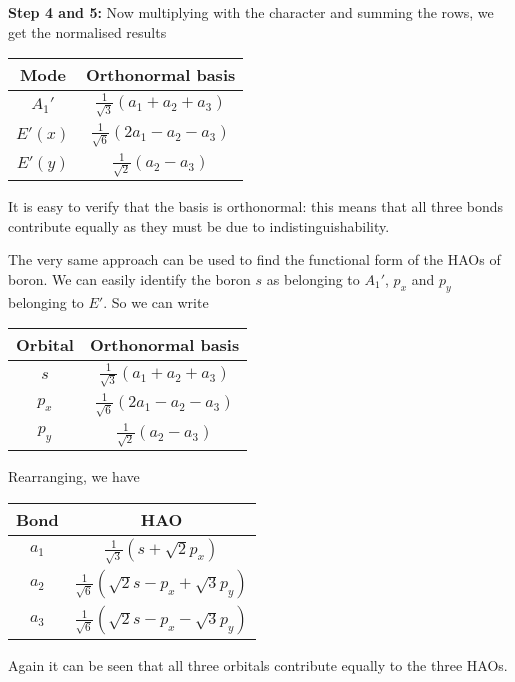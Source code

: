 \textbf{Step 4 and 5:} Now multiplying with the character and summing the rows, we get the normalised results
\begin{center}
	\begin{tabular}{c|c}
	Mode & Orthonormal basis\\
	\hline
	$A_1'$ & $\frac{1}{\sqrt{3}}(a_1+a_2+a_3)$\\
	$E'(x)$ & $\frac{1}{\sqrt{6}}(2a_1-a_2-a_3) $\\
	$E'(y)$ & $\frac{1}{\sqrt{2}}(a_2-a_3) $
	\end{tabular}
\end{center}
It is easy to verify that the basis is orthonormal: this means that all three bonds contribute equally as they must be due to indistinguishability. \par
The very same approach can be used to find the functional form of the HAOs of boron. We can easily identify the boron $s$ as belonging to $A_1'$, $p_x$ and $p_y$ belonging to $E'$. So we can write
\begin{center}
	\begin{tabular}{c|c}
	Orbital & Orthonormal basis\\
	\hline
	$s$ & $\frac{1}{\sqrt{3}}(a_1+a_2+a_3)$\\
	$p_x$ & $\frac{1}{\sqrt{6}}(2a_1-a_2-a_3) $\\
	$p_y$ & $\frac{1}{\sqrt{2}}(a_2-a_3) $
	\end{tabular}
\end{center}
Rearranging, we have
\begin{center}
	\begin{tabular}{c|c}
	Bond & HAO\\
	\hline
	$a_1$ & $\frac{1}{\sqrt{3}}(s+\sqrt{2}p_x)$\\
	$a_2$ & $\frac{1}{\sqrt{6}}(\sqrt{2}s-p_x+\sqrt{3}p_y) $\\
	$a_3$ & $\frac{1}{\sqrt{6}}(\sqrt{2}s-p_x-\sqrt{3}p_y) $
	\end{tabular}
\end{center}
Again it can be seen that all three orbitals contribute equally to the three HAOs.